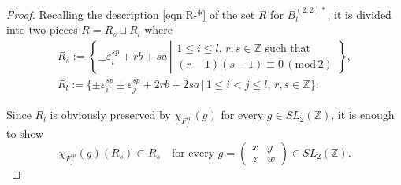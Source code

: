 \documentclass[11pt]{amsart}
\begin{document}
{{\begin{proof}
Recalling the description \eqref{eqn:R-*} of the set $R$ for $B_l^{(2,2)\ast}$, 
it is divided into two pieces $R=R_s\sqcup R_l$ where
\begin{equation*}%
\begin{array}{ll}
R_s:=\left\{\pm \varepsilon_i^{sp}+rb+sa\,\left|\begin{array}{c}
1\leq i\leq l,\, r,s\in\mathbb{Z}\mbox{ such that}\\
(r-1)(s-1)\equiv 0\,(\mathrm{mod}\,2)
\end{array}\right.\!\! \right\},\\[10pt]
R_l:=\{\pm\varepsilon_i^{sp}\pm\varepsilon_j^{sp}+2rb+2sa\,|\,
1\leq i<j\leq l,\, r,s\in\mathbb{Z}\}.
\end{array}
\end{equation*}

Since $R_l$ is obviously preserved by $\chi_{F_f^{sp}}(g)$ for every 
$g\in {SL}_2(\mathbb{Z})$, it is enough to show
\begin{equation}\label{eqn:stablility}
\chi_{F_f^{sp}}(g)(R_s)\subset R_s\quad \mbox{for every }g=
\begin{pmatrix} x & y \\ z & w\end{pmatrix}
\in {SL}_2(\mathbb{Z}).
\end{equation}


\end{proof}}}
\end{document}
